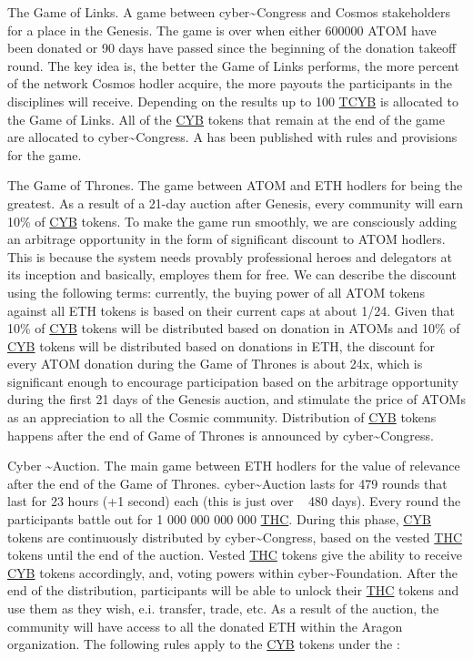 \documentclass[8pt,oneside]{amsart}
\newcommand{\linkgreen}[2]{\href{#1}{\color{green}{#2}}}
\begin{document}
The Game of Links. A game between cyber\~{}Congress and Cosmos stakeholders for a place in the Genesis. The game is over when either 600000 ATOM have been donated or 90 days have passed since the beginning of the donation takeoff round. The key idea is, the better the Game of Links performs, the more percent of the network Cosmos hodler acquire, the more payouts the participants in the disciplines will receive. Depending on the results up to 100 {\hyperref[cyb]{TCYB}} is allocated to the Game of Links. All of the {\hyperref[cyb]{CYB}} tokens that remain at the end of the game are allocated to cyber\~{}Congress. A \linkgreen{https://cybercongress.ai/game-of-links/}{detailed document} has been published with rules and provisions for the game.

The Game of Thrones. The game between ATOM and ETH hodlers for being the greatest. As a result of a 21-day auction after Genesis, every community will earn 10\% of {\hyperref[cyb]{CYB}} tokens. To make the game run smoothly, we are consciously adding an arbitrage opportunity in the form of significant discount to ATOM hodlers. This is because the system needs provably professional heroes and delegators at its inception and basically, employes them for free. We can describe the discount using the following terms: currently, the buying power of all ATOM tokens against all ETH tokens is based on their current caps at about 1/24. Given that 10\% of {\hyperref[cyb]{CYB}} tokens will be distributed based on donation in ATOMs and 10\% of {\hyperref[cyb]{CYB}} tokens will be distributed based on donations in ETH, the discount for every ATOM donation during the Game of Thrones is about 24x, which is significant enough to encourage participation based on the arbitrage opportunity during the first 21 days of the Genesis auction, and stimulate the price of ATOMs as an appreciation to all the Cosmic community. Distribution of {\hyperref[cyb]{CYB}} tokens happens after the end of Game of Thrones is announced by cyber\~{}Congress.

Cyber \~{}Auction. The main game between ETH hodlers for the value of relevance after the end of the Game of Thrones. cyber\~{}Auction lasts for 479 rounds that last for 23 hours (+1 second) each (this is just over ~ 480 days). Every round the participants battle out for 1 000 000 000 000 {\hyperref[thc]{THC}}. During this phase, {\hyperref[cyb]{CYB}} tokens are continuously distributed by cyber\~{}Congress, based on the vested {\hyperref[thc]{THC}} tokens until the end of the auction. Vested {\hyperref[thc]{THC}} tokens give the ability to receive {\hyperref[cyb]{CYB}} tokens accordingly, and, voting powers within cyber\~{}Foundation. After the end of the distribution, participants will be able to unlock their {\hyperref[thc]{THC}} tokens and use them as they wish, e.i. transfer, trade, etc. As a result of the auction, the community will have access to all the donated ETH within the Aragon organization. The following rules apply to the {\hyperref[cyb]{CYB}} tokens under the \linkgreen{https://cyber.page/network/cyber/contract/cyber147drnke9676972jr3anklkj7pzgwjw47cp2u7j}{multisig for distribution}:
\end{document}
